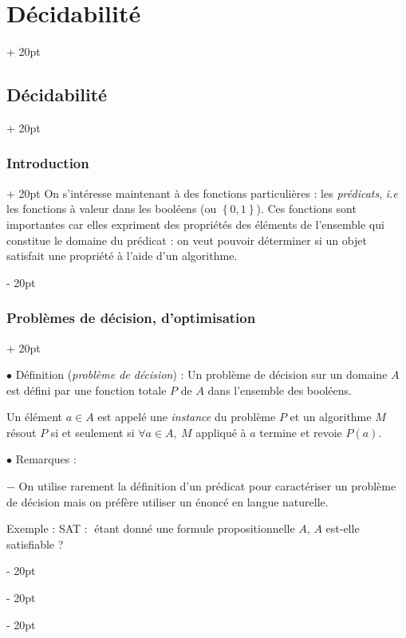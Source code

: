 \documentclass[a4paper, 12pt, twoside]{article}
\newcommand{\set}[1]{\left\{ #1 \right\}}
\newcommand{\simplecit}[1]{\guillemotleft$\;$#1$\;$\guillemotright}
\newcommand{\ind}[1][20pt]{\advance\leftskip + #1}
\newcommand{\deind}[1][20pt]{\advance\leftskip - #1}
\newenvironment{indt}[2][20pt]{#2 \par \ind[#1]}{\par \deind} %
\begin{document}
\begin{indt}{\section{Décidabilité}}
        \vspace{12pt}
        
        \begin{indt}{\subsection{Décidabilité}}
            \begin{indt}{\subsubsection{Introduction}}
                On s'intéresse maintenant à des fonctions particulières : les \emph{prédicats}, \textit{i.e} les fonctions à valeur dans les booléens (ou $\set{0, 1}$).
                Ces fonctions sont importantes car elles expriment des propriétés des éléments de l'ensemble qui constitue le domaine du prédicat : on veut pouvoir déterminer si un objet satisfait une propriété à l'aide d'un algorithme.
            \end{indt}

            \vspace{12pt}
            
            \begin{indt}{\subsubsection{Problèmes de décision, d'optimisation}}
                \label{1.2.2}

                $\bullet$ Définition (\textit{problème de décision}) :
                Un problème de décision sur un domaine $A$ est défini par une fonction totale $P$ de $A$ dans l'ensemble des booléens.

                Un élément $a \in A$ est appelé une \emph{instance} du problème $P$ et un algorithme $M$ résout $P$ si et seulement si $\forall a \in A,\ M$ appliqué à $a$ termine et revoie $P(a)$.

                \vspace{12pt}
                
                $\bullet$ Remarques :

                $-$ On utilise rarement la définition d'un prédicat pour caractériser un problème de décision mais on préfère utiliser un énoncé en langue naturelle.

                Exemple : SAT : \simplecit{étant donné une formule propositionnelle $A$, $A$ est-elle satisfiable ?}


\end{indt}
\end{indt}
\end{indt}
\end{document}
